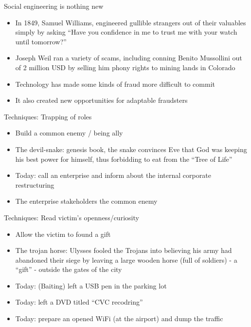 \documentclass{beamer}
\begin{document}
\begin{frame}{Social engineering is nothing new}
  \begin{itemize}
    \item In 1849, Samuel Williams, engineered gullible strangers out of
      their valuables simply by asking ``Have you confidence in me to
      trust me with your watch until tomorrow?''
    \item Joseph Weil ran a variety of scams, including conning Benito
      Mussollini out of 2 million USD by selling him phony rights to
      mining lands in Colorado
    \item Technology has made some kinds of fraud more difficult to
      commit
    \item It also created new opportunities for adaptable fraudsters
  \end{itemize}
\end{frame}


\begin{frame}{Techniques: Trapping of roles}
  \begin{itemize}
    \item Build a common enemy / being ally
    \item The devil-snake: genesis book, the snake convinces Eve that God was
      keeping his best power for himself, thus forbidding to eat from
      the ``Tree of Life''
    \item<2-> Today: call an enterprise and inform about the internal
      corporate restructuring
    \item<2-> The enterprise stakeholders the common enemy 
  \end{itemize}
\end{frame}

\begin{frame}{Techniques: Read victim's openness/curiosity}
  \begin{itemize}
    \item Allow the victim to found a gift
    \item The trojan horse: Ulysses fooled the Trojans into believing
       his army had abandoned their siege by leaving a large
      wooden horse (full of soldiers) - a ``gift'' - outside the gates of the city
    \item<2-> Today: (Baiting) left a USB pen in the parking lot
    \item<2-> Today: left a DVD titled ``CVC recodring''
    \item<2-> Today: prepare an opened WiFi (at the airport) and dump the traffic
  \end{itemize}
\end{frame}
\end{document}
